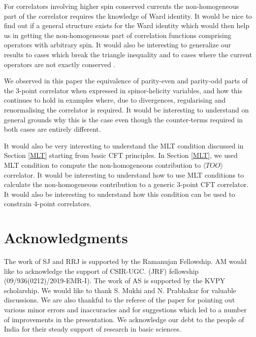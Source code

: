 \documentclass[a4paper,11pt]{article}
\begin{document}
For correlators involving higher spin conserved currents the non-homogeneous part of the correlator requires the knowledge of Ward identity. It would be nice to find out if a general structure exists for the Ward identity which would then help us in getting the non-homogeneous part of correlation functions comprising operators with arbitrary spin. It would also be interesting to generalize our results to cases which break the triangle inequality and to cases where the current operators are not exactly conserved \cite{Maldacena:2012sf}. 

We observed in this paper the equivalence of parity-even and parity-odd parts of the 3-point correlator when expressed in spinor-helicity variables, and how this continues to hold in examples where, due to divergences, regularising and renormalising the correlator is required. It would be interesting to understand on general grounds why this is the case even though the counter-terms required in both cases are entirely different.

It would also be very interesting to understand the MLT condition \cite{Jazayeri:2021fvk} discussed in Section \ref{MLT} starting from basic CFT principles. In Section \ref{MLT}, we used MLT condition to compute the non-homogeneous contribution to $\langle TOO \rangle$ correlator. It would be interesting to understand how to use MLT conditions to calculate the non-homogeneous contribution to a generic 3-point CFT correlator. It would also be interesting to understand how this condition can be used to constrain 4-point correlators.


\section*{Acknowledgments}
The work of SJ and RRJ is supported by the Ramanujan Fellowship. AM would like to acknowledge the support of CSIR-UGC.
(JRF) fellowship (09/936(0212)/2019-EMR-I). The work of AS is supported by the KVPY scholarship. We would like to thank S. Mukhi and N. Prabhakar for valuable discussions. We are also thankful to the referee of the paper for pointing out various minor errors and inaccuracies and for suggestions which led to a number of improvements in the presentation.
We acknowledge our debt to the people of India for their steady support of research in basic sciences.

\end{document}
